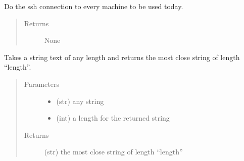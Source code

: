 \documentclass[a4paper,10pt,english]{sphinxmanual}
\begin{document}
\begin{fulllineitems}
\begin{fulllineitems}
\begin{quote}
\begin{description}
\end{description}\end{quote}

\end{fulllineitems}


\begin{fulllineitems}
\label{\detokenize{apidoc_commands/commands:commands.jobs.Jobs.ssh_connection_all_machines}}
Do the ssh connection to every machine to be used today.
\begin{quote}\begin{description}
\item[{Returns}] \leavevmode
None

\end{description}\end{quote}

\end{fulllineitems}


\begin{fulllineitems}
\label{\detokenize{apidoc_commands/commands:commands.jobs.Jobs.str_of_length}}
Takes a string text of any length and returns 
the most close string of length “length”.
\begin{quote}\begin{description}
\item[{Parameters}] \leavevmode\begin{itemize}
\item {} 
 \textendash{} (str) any string

\item {} 
 \textendash{} (int) a length for the returned string

\end{itemize}

\item[{Returns}] \leavevmode
(str) the most close string of length “length”

\end{description}\end{quote}


\end{fulllineitems}
\end{fulllineitems}
\end{document}
